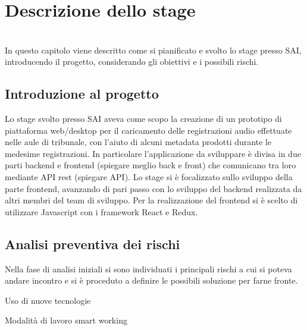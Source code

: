 
\chapter{Descrizione dello stage}
\label{cap:descrizione-stage}

\\
In questo capitolo viene descritto come si pianificato e svolto lo stage presso SAI, introducendo il progetto, considerando gli obiettivi e i possibili rischi.

\section{Introduzione al progetto}
Lo stage svolto presso SAI aveva come scopo la creazione di un prototipo di piattaforma web/desktop per il caricamento delle registrazioni audio effettuate nelle aule di tribunale, con l'aiuto di alcuni metadata prodotti durante le medesime registrazioni. In particolare l'applicazione da sviluppare è divisa in due parti backend e frontend (spiegare meglio back e front) che comunicano tra loro mediante API rest (spiegare API). Lo stage si è focalizzato sullo sviluppo della parte frontend, avanzando di pari passo con lo sviluppo del  backend realizzata da altri membri del team di sviluppo. Per la realizzazione del frontend si è scelto di utilizzare Javascript con i framework React e Redux. 

\section{Analisi preventiva dei rischi}

Nella fase di analisi iniziali si sono individuati i principali rischi a cui si poteva andare incontro e si è proceduto a definire le possibili soluzione per farne fronte.\\

\begin{risk}{Uso di nuove tecnologie}
    \label{risk:new-tecnology} 
\end{risk}
\begin{risk}{Modalità di lavoro smart working}
    \label{risk:smart-working} 
\end{risk}

